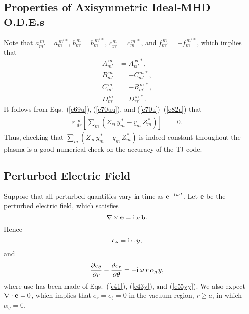 \documentclass[12pt,prb,aps]{revtex4-1}
\begin{document}
\subsection{Properties of Axisymmetric Ideal-MHD O.D.E.s}
Note   that
$a_{m'}^{\,m} =a_{m}^{\,m'\ast}$, 
$b_{m'}^{\,m} =b_{m}^{\,m'\ast}$, 
$c_{m'}^{\,m} =c_{m}^{\,m'\ast}$, and 
$f_{m'}^{\,m} =-f_{m}^{\,m'\ast}$,
which implies that
\begin{align}\label{e70u}
A_{m'}^{\,m} &= A_{m'}^{\,m\,\ast},\\[0.5ex]
B_{m'}^{\,m} &= -C_{m'}^{\,m\,\ast},\\[0.5ex]
C_{m'}^{\,m} &= -B_{m'}^{\,m\,\ast},\\[0.5ex]
D_{m'}^{\,m} &= D_{m'}^{\,m\,\ast}.\label{e82u}
\end{align}
It follows from Eqs.~(\ref{e69u}), (\ref{e70uu}), and (\ref{e70u})--(\ref{e82u}) that 
\begin{align}
r\,\frac{d}{dr}\!\left[\sum_m (Z_m\,y_m^{\,\ast}- y_m\,Z_m^{\,\ast}) \right]&= 0.
\end{align}
Thus, checking that $\sum_m (Z_m\,y_m^{\,\ast}- y_m\,Z_m^{\,\ast})$ is indeed constant throughout the plasma is a good numerical check on the accuracy of the TJ
code. 

\subsection{Perturbed Electric Field}
Suppose that all perturbed quantities vary in time as ${\rm e}^{-{\rm i}\,\omega\,t}$. 
Let ${\bf e}$ be the perturbed electric field, which satisfies 
\begin{equation}
\nabla\times {\bf e} = {\rm i}\,\omega\,{\bf b}.
\end{equation}
Hence,
\begin{equation}\label{ephi}
e_\phi = {\rm i}\,\omega\,y,
\end{equation}
and 
\begin{equation}\label{e81op}
\frac{\partial e_\theta}{\partial r} - \frac{\partial e_r}{\partial\theta} = - {\rm i}\,\omega\,r\,\alpha_g\,y,
\end{equation}
where use has been made of Eqs.~(\ref{e41}), (\ref{e43y}), and (\ref{e55yy}).
We also expect $\nabla\cdot{\bf e} =0$, which implies that 
$e_r=e_\theta=0$ in the vacuum region, $r\geq a$, in which $\alpha_g=0$. 
\end{document}
